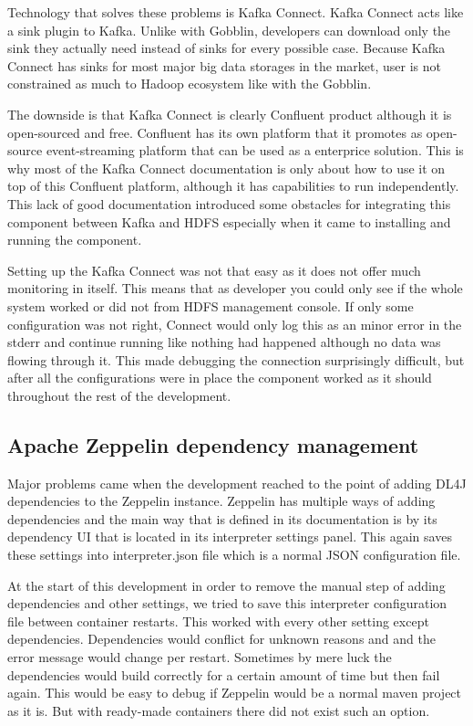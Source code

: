 Technology that solves these problems is Kafka Connect. 
Kafka Connect acts like a sink plugin to Kafka.
Unlike with Gobblin, developers can download only the sink they actually need instead of sinks for every possible case.
Because Kafka Connect has sinks for most major big data storages in the market, user is not constrained as much to Hadoop ecosystem like with the Gobblin.

The downside is that Kafka Connect is clearly Confluent product although it is open-sourced and free.
Confluent has its own platform that it promotes as open-source event-streaming platform that can be used as a enterprice solution. 
This is why most of the Kafka Connect documentation is only about how to use it on top of this Confluent platform, although it has capabilities to run independently.
This lack of good documentation introduced some obstacles for integrating this component between Kafka and HDFS especially when it came to installing and running the component.

Setting up the Kafka Connect was not that easy as it does not offer much monitoring in itself.
This means that as developer you could only see if the whole system worked or did not from HDFS management console.
If only some configuration was not right, Connect would only log this as an minor error in the stderr and continue running like nothing had happened although no data was flowing through it.
This made debugging the connection surprisingly difficult, but after all the configurations were in place the component worked as it should throughout the rest of the development.

\subsection{Apache Zeppelin dependency management}

Major problems came when the development reached to the point of adding DL4J dependencies to the Zeppelin instance.
Zeppelin has multiple ways of adding dependencies and the main way that is defined in its documentation is by its dependency UI that is located in its interpreter settings panel.
This again saves these settings into interpreter.json file which is a normal JSON configuration file.

At the start of this development in order to remove the manual step of adding dependencies and other settings, we tried to save this interpreter configuration file between container restarts.
This worked with every other setting except dependencies.
Dependencies would conflict for unknown reasons and and the error message would change per restart.
Sometimes by mere luck the dependencies would build correctly for a certain amount of time but then fail again.
This would be easy to debug if Zeppelin would be a normal maven project as it is.
But with ready-made containers there did not exist such an option.

